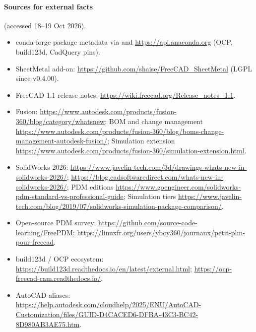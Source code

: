 \paragraph{Sources for external facts} (accessed 18--19 Oct 2026).
{\small
\begin{itemize}
  \item conda-forge package metadata via  and \url{https://api.anaconda.org} (OCP, build123d, CadQuery pins).
  \item SheetMetal add-on: \url{https://github.com/shaise/FreeCAD_SheetMetal} (LGPL since v0.4.00).
  \item FreeCAD 1.1 release notes: \url{https://wiki.freecad.org/Release_notes_1.1}.
  \item Fusion: \url{https://www.autodesk.com/products/fusion-360/blog/category/whatsnew};
        BOM and change management \url{https://www.autodesk.com/products/fusion-360/blog/boms-change-management-autodesk-fusion/};
        Simulation extension \url{https://www.autodesk.com/products/fusion-360/simulation-extension.html}.
  \item SolidWorks 2026: \url{https://www.javelin-tech.com/3d/drawings-whats-new-in-solidworks-2026/};
        \url{https://blog.cadsoftwaredirect.com/whats-new-in-solidworks-2026/};
        PDM editions \url{https://www.goengineer.com/solidworks-pdm-standard-vs-professional-guide};
        Simulation tiers \url{https://www.javelin-tech.com/blog/2019/07/solidworks-simulation-package-comparison/}.
  \item Open-source PDM survey: \url{https://github.com/source-code-learning/FreePDM};
        \url{https://linuxfr.org/users/yboy360/journaux/petit-plm-pour-freecad}.
  \item build123d / OCP ecosystem: \url{https://build123d.readthedocs.io/en/latest/external.html};
        \url{https://ocp-freecad-cam.readthedocs.io/}.
  \item AutoCAD aliases: \url{https://help.autodesk.com/cloudhelp/2025/ENU/AutoCAD-Customization/files/GUID-D4CACED6-DFBA-43C3-BC42-8D980AB3AE75.htm}.
\end{itemize}}
